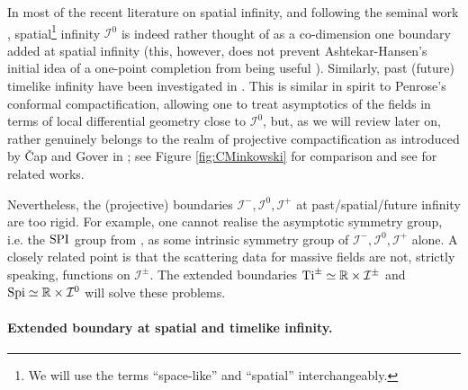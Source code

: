 \documentclass[a4paper, 10pt]{article}
\theoremstyle{remark}
\newcommand{\Ti}{\textnormal{Ti}}
\newcommand{\Spi}{\textnormal{Spi}}
\newcommand{\SPI}{\textnormal{SPI}}%
\begin{document}
In most of the recent literature on spatial infinity, and following the seminal work \cite{beig_einsteins_1982,Ashtekar:1991vb,Friedrich:1998-83}, spatial\footnote{We will use the terms \enquote{space-like} and \enquote{spatial} interchangeably.} infinity $\mathcal{I}^0$ is indeed rather thought of as a co-dimension one boundary added at spatial infinity \cite{Friedrich:1999wk,Friedrich:2002ru,Kroon:2003ix,Kroon:2004pu,Kroon:2004me,Compere:2011ve,Hintz:2017xxu,troessaert_bms4_2018,Henneaux:2018mgn,AliMohamed:2021nuc,Capone:2022gme,Fuentealba:2022xsz,Mohamed:2023ttb,Mohamed:2023jwv,Hintz:2023kjj,Fuentealba:2023rvf,Fuentealba:2023hzq,Fuentealba:2023syb,Gasperin:2024bfc,Fiorucci:2024ndw,Fuentealba:2024lll} (this, however, does not prevent Ashtekar-Hansen's initial idea of a one-point completion from being useful \cite{Chrusciel:1989ye,Herberthson:1992gcz,Prabhu:2019fsp,Prabhu:2021cgk,Ashtekar:2023zul,Ashtekar:2024aa}). Similarly, past (future) timelike infinity have been investigated in \cite{Gen:1997az,Cutler:1989,Porrill:1982,Campiglia:2015kxa,Campiglia:2015qka,Campiglia:2015lxa,Chakraborty:2021sbc,Compere:2023qoa}.  This is similar in spirit to Penrose's conformal compactification, allowing one to treat asymptotics of the fields in terms of local differential geometry close to $\mathcal{I}^0$, but, as we will review later on, rather genuinely belongs to the realm of projective compactification as introduced by Čap and Gover in \cite{Cap:2014aa,Cap:2014ab}; see Figure \ref{fig:CMinkowski} for comparison and see \cite{eastwood_bgg_2011,cap_projective_2012,cap_holonomy_2014,cap_projective_2016-1,Gover:2018vui,Borthwick_Proca_Projective,Flood:2018aa,RSTA20230042,Borthwick:2024wfn} for related works. 

Nevertheless, the (projective) boundaries $\mathcal{I}^-, \mathcal{I}^0,\mathcal{I}^+$ at past/spatial/future infinity are too rigid. For example, one cannot realise the asymptotic symmetry group, i.e. the $\SPI$ group from \cite{Ashtekar:1991vb}, as some intrinsic symmetry group of $\mathcal{I}^-, \mathcal{I}^0,\mathcal{I}^+$ alone. A closely related point is that the scattering data for massive fields are not, strictly speaking, functions on $\mathcal{I}^\pm$. The extended boundaries $\Ti^{\pm} \simeq \mathbb{R} \times \mathcal{I}^{\pm}$ and $\Spi \simeq \mathbb{R} \times \mathcal{I}^{0}$ will solve these problems.

\paragraph{Extended boundary at spatial and timelike infinity.}\mbox{}
\end{document}
